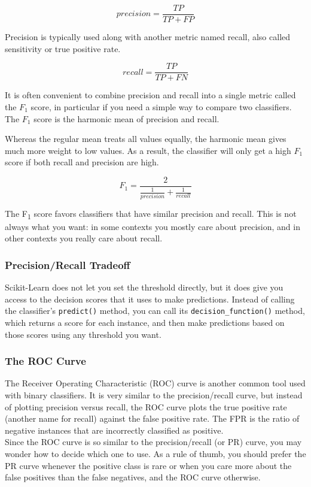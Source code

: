 \documentclass[french]{article}
\begin{document}
\[precision = \frac{TP}{TP + FP}\]

Precision is typically used along with another metric named recall, also called sensitivity or true positive rate.

\[recall = \frac{TP}{TP + FN}\]

It is often convenient to combine precision and recall into a single metric called the $F_1$ score, in particular if you need a simple way to compare two classifiers. The $F_1$ score is the harmonic mean of precision and recall.

Whereas the regular mean treats all values equally, the harmonic mean gives much more weight to low values.  As a result, the classifier will only get a high $F_1$ score if both recall and precision are high.

\[F_1 = \frac{2}{\frac{1}{precision} + \frac{1}{recall}}\]

The F\textsubscript{1} score favors classifiers that have similar precision and recall. This is not always what you want: in some contexts you mostly care about precision, and in other contexts you really care about recall.

\subsubsection{Precision/Recall Tradeoff}

Scikit-Learn does not let you set the threshold directly, but it does give you access to the decision scores that it uses to make predictions. Instead of calling the classifier’s \lstinline{predict()} method, you can call its \lstinline{decision_function()} method, which returns a score for each instance, and then make predictions based on those scores using any threshold you want.

\subsubsection{The ROC Curve}

The Receiver Operating Characteristic (ROC) curve is another common tool used with binary classifiers. It is very similar to the precision/recall curve, but instead of plotting precision versus recall, the ROC curve plots the true positive rate (another name for recall) against the false positive rate. The FPR is the ratio of negative instances that are incorrectly classified as positive.\\

Since the ROC curve is so similar to the precision/recall (or PR) curve, you may wonder how to decide which one to use. As a rule of thumb, you should prefer the PR curve whenever the positive class is rare or when you care more about the false positives than the false negatives, and the ROC curve otherwise.
\end{document}
